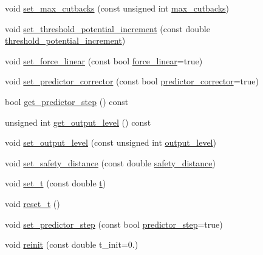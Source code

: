 \begin{DoxyCompactItemize}
\item 
void \hyperlink{classincremental_f_e_1_1_global_data_incremental_f_e_a892280978280b21be48bafed07d7c60a}{set\+\_\+max\+\_\+cutbacks} (const unsigned int \hyperlink{classincremental_f_e_1_1_global_data_incremental_f_e_a7ae58573e9cc241a14976bf19351ba63}{max\+\_\+cutbacks})
\item 
void \hyperlink{classincremental_f_e_1_1_global_data_incremental_f_e_a09f0851c50886a9f57996558c08fc108}{set\+\_\+threshold\+\_\+potential\+\_\+increment} (const double \hyperlink{classincremental_f_e_1_1_global_data_incremental_f_e_a2f7adb8b4f7f8875715e1dbd0edd9ac8}{threshold\+\_\+potential\+\_\+increment})
\item 
void \hyperlink{classincremental_f_e_1_1_global_data_incremental_f_e_aba65d5da0031c2f1bc1ceb87dc524b8d}{set\+\_\+force\+\_\+linear} (const bool \hyperlink{classincremental_f_e_1_1_global_data_incremental_f_e_a37c1d42902e74f13f3c4ba82d2dabd67}{force\+\_\+linear}=true)
\item 
void \hyperlink{classincremental_f_e_1_1_global_data_incremental_f_e_a82d4ae6026b8c8a4a4da1c54e81fd64a}{set\+\_\+predictor\+\_\+corrector} (const bool \hyperlink{classincremental_f_e_1_1_global_data_incremental_f_e_a5cc0d20e5e389c149bbd288f57dee953}{predictor\+\_\+corrector}=true)
\item 
bool \hyperlink{classincremental_f_e_1_1_global_data_incremental_f_e_a6814f2a2bf9f3369b9d1ea7ee8cab33a}{get\+\_\+predictor\+\_\+step} () const 
\item 
unsigned int \hyperlink{classincremental_f_e_1_1_global_data_incremental_f_e_a5d95155e9cc3cae28a5fbe7866f603d7}{get\+\_\+output\+\_\+level} () const 
\item 
void \hyperlink{classincremental_f_e_1_1_global_data_incremental_f_e_a44ec19d072819c3531be56ada4b7d077}{set\+\_\+output\+\_\+level} (const unsigned int \hyperlink{classincremental_f_e_1_1_global_data_incremental_f_e_a0d5cf3ecf70ec61771bbcfe45d0e6b5d}{output\+\_\+level})
\item 
void \hyperlink{classincremental_f_e_1_1_global_data_incremental_f_e_a916e33b7d8d6dcc1a113c130c995f8b3}{set\+\_\+safety\+\_\+distance} (const double \hyperlink{classincremental_f_e_1_1_global_data_incremental_f_e_a6db92e8e97c6875df1ecf5aa2a3a0345}{safety\+\_\+distance})
\item 
void \hyperlink{classincremental_f_e_1_1_global_data_incremental_f_e_a27354ebc5bf9ec655f5c7cc16ac9876d}{set\+\_\+t} (const double \hyperlink{classincremental_f_e_1_1_global_data_incremental_f_e_abb14e15389af3772905a3c75e12ed2c0}{t})
\item 
void \hyperlink{classincremental_f_e_1_1_global_data_incremental_f_e_ab86938372e460e4253c5cc22edffbf94}{reset\+\_\+t} ()
\item 
void \hyperlink{classincremental_f_e_1_1_global_data_incremental_f_e_ae8037538c6a7fc8b05168fe006ed2083}{set\+\_\+predictor\+\_\+step} (const bool \hyperlink{classincremental_f_e_1_1_global_data_incremental_f_e_afe172fdb882f9dd0cd5f963386dd2ffb}{predictor\+\_\+step}=true)
\item 
void \hyperlink{classincremental_f_e_1_1_global_data_incremental_f_e_a74424d0040a6f5c2aa545288b42483f4}{reinit} (const double t\+\_\+init=0.)
\end{DoxyCompactItemize}

